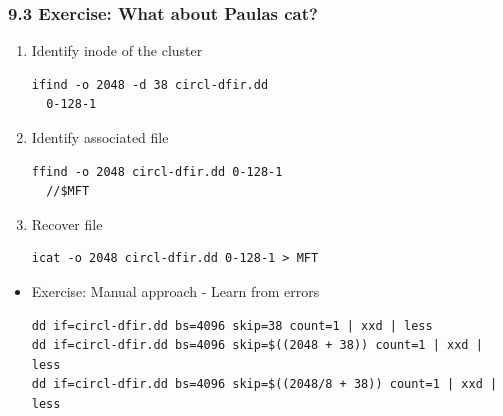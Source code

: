 \begin{frame}[fragile]
  \frametitle{9.3 Exercise: What about Paulas cat?}
    \begin{enumerate}
        \conti
        \item Identify inode of the cluster
        \begin{lstlisting}[basicstyle=\tiny]
ifind -o 2048 -d 38 circl-dfir.dd 
  0-128-1
        \end{lstlisting}

        \item Identify associated file
        \begin{lstlisting}[basicstyle=\tiny]
ffind -o 2048 circl-dfir.dd 0-128-1
  //$MFT
        \end{lstlisting}

        \item Recover file
        \begin{lstlisting}[basicstyle=\tiny]
icat -o 2048 circl-dfir.dd 0-128-1 > MFT
        \end{lstlisting}
    \end{enumerate}
    \begin{itemize}
        \item[] Exercise: Manual approach - Learn from errors
        \begin{lstlisting}[basicstyle=\tiny]
dd if=circl-dfir.dd bs=4096 skip=38 count=1 | xxd | less
dd if=circl-dfir.dd bs=4096 skip=$((2048 + 38)) count=1 | xxd | less
dd if=circl-dfir.dd bs=4096 skip=$((2048/8 + 38)) count=1 | xxd | less
        \end{lstlisting}
        \end{itemize}
\end{frame}



